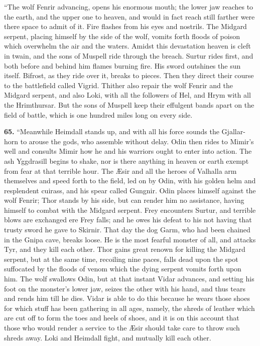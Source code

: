 ``The wolf Fenrir advancing, opens his enormous mouth; the lower jaw
reaches to the earth, and the upper one to heaven, and would in fact
reach still farther were there space to admit of it. Fire flashes from
his eyes and nostrils. The Midgard serpent, placing himself by the
side of the wolf, vomits forth floods of poison which overwhelm the
air and the waters. Amidst this devastation heaven is cleft in twain,
and the sons of Muspell ride through the breach. Surtur rides first,
and both before and behind him flames burning fire. His sword
outshines the sun itself. Bifrost, as they ride over it, breaks to
pieces. Then they direct their course to the battlefield called
Vigrid. Thither also repair the wolf Fenrir and the Midgard serpent,
and also Loki, with all the followers of Hel, and Hrym with all the
Hrimthursar. But the sons of Muspell keep their effulgent bands apart
on the field of battle, which is one hundred miles long on every side.

\textbf{65.} ``Meanwhile Heimdall stands up, and with all his force sounds the
Gjallar-horn to arouse the gods, who assemble without delay. Odin
then rides to Mimir's well and consults Mimir how he and his warriors
ought to enter into action. The ash Yggdrasill begins to shake, nor is
there anything in heaven or earth exempt from fear at that terrible
hour. The Æsir and all the heroes of Valhalla arm themselves and speed
forth to the field, led on by Odin, with his golden helm and
resplendent cuirass, and his spear called Gungnir. Odin places himself
against the wolf Fenrir; Thor stands by his side, but can render him
no assistance, having himself to combat with the Midgard serpent. Frey
encounters Surtur, and terrible blows are exchanged ere Frey falls;
and he owes his defeat to his not having that trusty sword he gave to
Skirnir. That day the dog Garm, who had been chained in the Gnipa
cave, breaks loose. He is the most fearful monster of all, and attacks
Tyr, and they kill each other. Thor gains great renown for killing the
Midgard serpent, but at the same time, recoiling nine paces, falls
dead upon the spot suffocated by the floods of venom which the dying
serpent vomits forth upon him. The wolf swallows Odin, but at that
instant Vidar advances, and setting his foot on the monster's lower
jaw, seizes the other with his hand, and thus tears and rends him till
he dies. Vidar is able to do this because he wears those shoes for
which stuff has been gathering in all ages, namely, the shreds of
leather which are cut off to form the toes and heels of shoes, and it
is on this account that those who would render a service to the Æsir
should take care to throw such shreds away. Loki and Heimdall fight,
and mutually kill each other.

